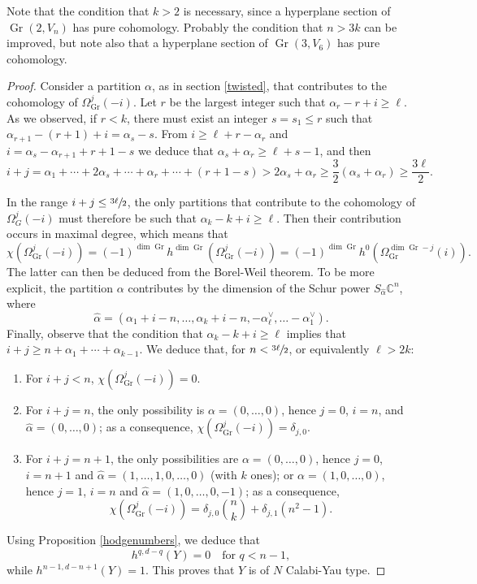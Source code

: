 \documentclass[11pt]{article}
\theoremstyle{plain}
\theoremstyle{definition}
\DeclareMathOperator{\Gr}{Gr}
\newcommand{\CC}{\mathbb{C}}
\begin{document}
Note that the condition that $k>2$ is necessary, since a hyperplane section of $\Gr(2,V_n)$
has pure cohomology. Probably the condition that $n>3k$ can be improved, but note also that a
hyperplane section of $\Gr(3,V_6)$ has pure cohomology.

\begin{proof}
Consider a partition $\alpha$, as in section \ref{twisted}, that contributes to the
cohomology of $\Omega^j_{\Gr}(-i)$. Let $r$ be the
largest integer such that $\alpha_r-r+i\ge \ell$. As we observed, if $r<k$, there must
exist an integer $s=s_1\le r$ such that $\alpha_{r+1}-(r+1)+i=\alpha_{s}-s$.
From $i\ge \ell+r-\alpha_r$ and $i=\alpha_s-\alpha_{r+1}+r+1-s$ we deduce
that $\alpha_s+\alpha_r\ge \ell+s-1$, and then
\[
i+j =\alpha_1+\cdots +2\alpha_s+\cdots +\alpha_r+\cdots +(r+1-s)>2\alpha_s+\alpha_r\ge \frac{3}{2}(\alpha_s+\alpha_r)
\ge \frac{3\ell}{2}.
\]

In the range $i+j\le \sfrac{3\ell}{2}$, the only partitions that contribute to the cohomology of
$\Omega_G^j(-i)$ must therefore be such that $\alpha_k-k+i\ge \ell$. Then their contribution
occurs in maximal degree, which means that
\[
\chi(\Omega_{\Gr}^j(-i))=(-1)^{\dim {\Gr}}h^{\dim {\Gr}}(\Omega_{\Gr}^j(-i))=(-1)^{\dim {\Gr}}h^0(\Omega_{\Gr}^{\dim {\Gr}-j}(i)).
\]
The latter can then be deduced from the Borel-Weil theorem. To be more explicit, the partition
$\alpha$ contributes by the dimension of the Schur power $S_{\hat{\alpha}}\CC^n$,
where
\[
\hat{\alpha} = (\alpha_1+i-n,\ldots ,\alpha_k+i-n,-\alpha_\ell^\vee, \ldots -\alpha_1^\vee).
\] Finally, observe that the condition that
$\alpha_k-k+i\ge \ell$ implies that $i+j\ge n+\alpha_1+\cdots +\alpha_{k-1}$. We deduce
that, for $n<\sfrac{3\ell}{2}$, or equivalently $\ell >2k$:
\begin{enumerate}
\item For $i+j<n$, $\chi(\Omega_{\Gr}^j(-i))=0$.
\item For $i+j=n$, the only possibility is $\alpha = (0,\ldots ,0)$, hence $j=0$, $i=n$, and $\hat{\alpha}=(0,\ldots ,0)$; as a consequence, $\chi(\Omega_{\Gr}^j(-i))=\delta_{j,0}$.
\item For $i+j=n+1$, the only possibilities are $\alpha = (0,\ldots ,0)$, hence $j=0$, $i=n+1$
and $\hat{\alpha}=(1,\ldots ,1,0,\ldots ,0)$ (with $k$ ones); or $\alpha = (1,0,\ldots ,0)$,
hence $j=1$, $i=n$ and $\hat{\alpha}=(1,0,\ldots ,0,-1)$; as a consequence,
\[
\chi(\Omega_{\Gr}^j(-i))=\delta_{j,0}\binom{n}{k}+\delta_{j,1}(n^2-1).
\]
\end{enumerate}
Using Proposition \ref{hodgenumbers}, we deduce that
\[
h^{q,d-q}(Y)=0\quad\text{for }q<n-1,
\]
while $h^{n-1,d-n+1}(Y)=1$. This proves that $Y$ is of $N$ Calabi-Yau type.
\end{proof}
\end{document}
